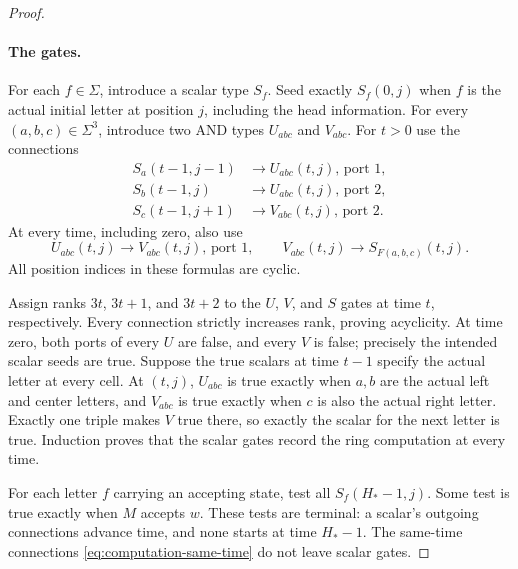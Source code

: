 \begin{proof}
\paragraph{The gates.}
For each $f\in\Sigma$, introduce a scalar type $S_f$. Seed exactly
$S_f(0,j)$ when $f$ is the actual initial letter at position $j$, including
the head information. For every $(a,b,c)\in\Sigma^3$, introduce two AND
types $U_{abc}$ and $V_{abc}$. For $t>0$ use the connections
\begin{align}
 S_a(t-1,j-1)&\longrightarrow U_{abc}(t,j)\text{, port }1,
 \label{eq:computation-left}\\
 S_b(t-1,j)&\longrightarrow U_{abc}(t,j)\text{, port }2,
 \label{eq:computation-center}\\
 S_c(t-1,j+1)&\longrightarrow V_{abc}(t,j)\text{, port }2.
 \label{eq:computation-right}
\end{align}
At every time, including zero, also use
\begin{equation}\label{eq:computation-same-time}
 U_{abc}(t,j)\longrightarrow V_{abc}(t,j)\text{, port }1,
 \qquad
 V_{abc}(t,j)\longrightarrow S_{F(a,b,c)}(t,j).
\end{equation}
All position indices in these formulas are cyclic.

Assign ranks $3t$, $3t+1$, and $3t+2$ to the $U$, $V$, and $S$ gates at
time $t$, respectively. Every connection strictly increases rank, proving
acyclicity. At time zero, both ports of every $U$ are false, and every $V$
is false; precisely the intended scalar seeds are true. Suppose the true
scalars at time $t-1$ specify the actual letter at every cell. At $(t,j)$,
$U_{abc}$ is true exactly when $a,b$ are the actual left and center
letters, and $V_{abc}$ is true exactly when $c$ is also the actual right
letter. Exactly one triple makes $V$ true there, so exactly the scalar
for the next letter is true. Induction proves that the scalar gates
record the ring computation at every time.

For each letter $f$ carrying an accepting state, test all
$S_f(H_*-1,j)$. Some test is true exactly when $M$ accepts $w$.
These tests are terminal: a scalar's outgoing connections advance time,
and none starts at time $H_*-1$. The same-time connections
\eqref{eq:computation-same-time} do not leave scalar gates.


\end{proof}
